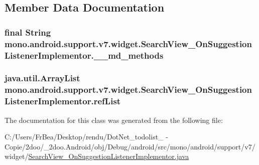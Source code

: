\subsection{Member Data Documentation}
\hypertarget{classmono_1_1android_1_1support_1_1v7_1_1widget_1_1_search_view___on_suggestion_listener_implementor_44a48ff09acbe6b4fd082f476212f5c7}{
\subsubsection[{\_\-\_\-md\_\-methods}]{\setlength{\rightskip}{0pt plus 5cm}final String {\bf mono.android.support.v7.widget.SearchView\_\-OnSuggestionListenerImplementor.\_\-\_\-md\_\-methods}}}
\label{classmono_1_1android_1_1support_1_1v7_1_1widget_1_1_search_view___on_suggestion_listener_implementor_44a48ff09acbe6b4fd082f476212f5c7}


\hypertarget{classmono_1_1android_1_1support_1_1v7_1_1widget_1_1_search_view___on_suggestion_listener_implementor_a2dbc37028b9d9d70be2d2a02ecf08ac}{
\subsubsection[{refList}]{\setlength{\rightskip}{0pt plus 5cm}java.util.ArrayList {\bf mono.android.support.v7.widget.SearchView\_\-OnSuggestionListenerImplementor.refList}}}
\label{classmono_1_1android_1_1support_1_1v7_1_1widget_1_1_search_view___on_suggestion_listener_implementor_a2dbc37028b9d9d70be2d2a02ecf08ac}




The documentation for this class was generated from the following file:\begin{CompactItemize}
\item 
C:/Users/FrBea/Desktop/rendu/DotNet\_\-todolist\_ - Copie/2doo/\_\-2doo.Android/obj/Debug/android/src/mono/android/support/v7/widget/\hyperlink{_search_view___on_suggestion_listener_implementor_8java}{SearchView\_\-OnSuggestionListenerImplementor.java}\end{CompactItemize}
